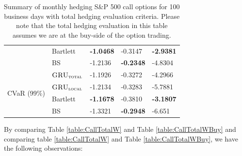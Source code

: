 \documentclass[letterpaper,12pt,titlepage,oneside,final]{book}
\numberwithin{equation}{section}
\theoremstyle{definition}
\newcommand{\modelT}{\textsc{GRU}_{\textsc{total}}}
\newcommand{\modelL}{\textsc{GRU}_{\textsc{local}}}
\begin{document}
\begin{table}[htp!]
\begin{tabular}{ll|l|l|l|}
		\multicolumn{1}{|l|}{}                                & Bartlett 	 &\textbf{-1.0468}  &-0.3147           			&\textbf{-2.9381}         \\  
		\multicolumn{1}{|l|}{}                                & BS       	 &-1.2136 			& \textbf{-0.2348} 		    & -4.8304         \\ 
		\hline
		\multicolumn{1}{|l|}{\multirow{4}{*}{CVaR (99\%)}}    & $\modelT$    &-1.1926 			&-0.3272 		    & -4.2966          \\  
		\multicolumn{1}{|l|}{}                                & $\modelL$    &-1.2134 			&-0.3283 		    & -5.7881         \\  
		\multicolumn{1}{|l|}{}                                & Bartlett 	 &\textbf{-1.1678}  &-0.3810            &\textbf{-3.1807}          \\  
		\multicolumn{1}{|l|}{}                                & BS       	 &-1.3321 			&\textbf{-0.2948}   & -6.651          \\ 
		\hline
	\end{tabular}
	\caption{Summary of monthly hedging S\&P 500 call options for 100 business days with total hedging evaluation criteria. Please note that the total hedging evaluation in this table assumes we are at the buy-side of the option trading.} \label{table:CallTotalMBuy}
\end{table}
By comparing Table \ref{table:CallTotalW} and Table \ref{table:CallTotalWBuy} and  comparing table \ref{table:CallTotalW} and Table \ref{table:CallTotalWBuy}, we have the  following observations:
\end{document}
